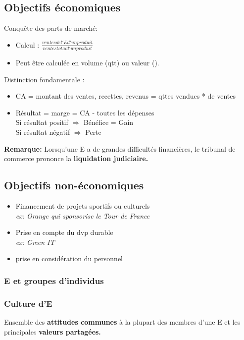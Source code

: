 \documentclass[a4paper,11pt]{report}
\begin{document}
\subsection{Objectifs économiques}
Conquête des parts de marché:
\begin{itemize}
    \item Calcul : $ \frac{ventes de l'E d'un produit}{ventes total d'un produit} $ 
    \item Peut être calculée en volume (qtt) ou valeur (\texteuro). \\
\end{itemize}
Distinction fondamentale : 
\begin{itemize}
    \item CA = montant des ventes, recettes, revenus = qttes vendues * \texteuro  de ventes
    \item Résultat = marge = CA - toutes les dépenses \\
    Si résultat positif $\Rightarrow$ Bénéfice = Gain \\
    Si résultat négatif $\Rightarrow$ Perte \\
\end{itemize}
\textbf{Remarque: } Lorsqu'une E a de grandes difficultés financières, le tribunal de commerce prononce la \textbf{liquidation judiciaire.} 

\subsection{Objectifs non-économiques}
\begin{itemize}
    \item Financement de projets sportifs ou culturels \\
    \textit{ex: Orange qui sponsorise le Tour de France}
    \item Prise en compte du dvp durable \\
    \textit{ex: Green IT}
    \item prise en considération du personnel
\end{itemize}
\subsubsection{E et groupes d'individus}
\subsubsection{Culture d'E}
Ensemble des \textbf{attitudes communes} à la plupart des membres d'une E et les principales \textbf{valeurs partagées.}
\end{document}
